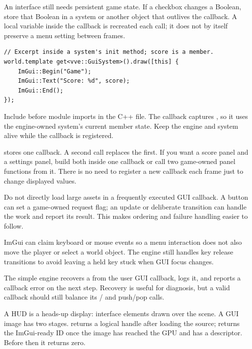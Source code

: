 \documentclass[11pt,a4paper]{article}
\begin{document}
An interface still needs persistent game state. If a checkbox changes a Boolean, store that Boolean in a system or another object that outlives the callback. A local variable inside the callback is recreated each call; it does not by itself preserve a menu setting between frames.
\begin{lstlisting}
// Excerpt inside a system's init method; score is a member.
world.template get<vve::GuiSystem>().draw([this] {
    ImGui::Begin("Game");
    ImGui::Text("Score: %d", score);
    ImGui::End();
});
\end{lstlisting}
Include  before module imports in the C++ file. The callback captures , so it uses the engine-owned system's current member state. Keep the engine and system alive while the callback is registered.

 stores one callback. A second call replaces the first. If you want a score panel and a settings panel, build both inside one callback or call two game-owned panel functions from it. There is no need to register a new callback each frame just to change displayed values.

Do not directly load large assets in a frequently executed GUI callback. A button can set a game-owned request flag; an update or deliberate transition can handle the work and report its result. This makes ordering and failure handling easier to follow.

ImGui can claim keyboard or mouse events so a menu interaction does not also move the player or select a world object. The engine still handles key release transitions to avoid leaving a held key stuck when GUI focus changes.

The simple engine recovers a  from the user GUI callback, logs it, and reports a callback error on the next step. Recovery is useful for diagnosis, but a valid callback should still balance its / and push/pop calls.

A HUD is a heads-up display: interface elements drawn over the scene. A GUI image has two stages.  returns a logical handle after loading the source;  returns the ImGui-ready ID once the image has reached the GPU and has a descriptor. Before then it returns zero.
\end{document}
